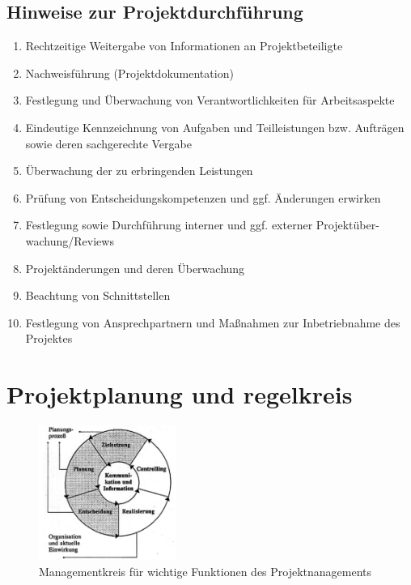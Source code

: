 \documentclass[11pt,a4paper]{article}
\begin{document}
\subsection{Hinweise zur Projektdurchführung}
\begin{enumerate}
\item Rechtzeitige Weitergabe von Informationen an Projektbeteiligte
\item Nachweisführung (Projektdokumentation)
\item Festlegung und Überwachung von Verantwortlichkeiten für Arbeitsaspekte
\item Eindeutige Kennzeichnung von Aufgaben und Teilleistungen bzw.
Aufträgen sowie deren sachgerechte Vergabe
\item Überwachung der zu erbringenden Leistungen
\item Prüfung von Entscheidungskompetenzen und ggf. Änderungen erwirken
\item Festlegung sowie Durchführung interner und ggf. externer Projektüber-
wachung/Reviews
\item Projektänderungen und deren Überwachung
\item Beachtung von Schnittstellen
\item Festlegung von Ansprechpartnern und Maßnahmen
zur Inbetriebnahme des Projektes
\end{enumerate}

\pagebreak
\section{Projektplanung und regelkreis}

\begin{figure}[H]
	\centering

	\includegraphics[width=0.4\textwidth]{ch8/managementkreis}
	\caption*{Managementkreis für wichtige Funktionen des Projektnanagements}
\end{figure}
\end{document}

